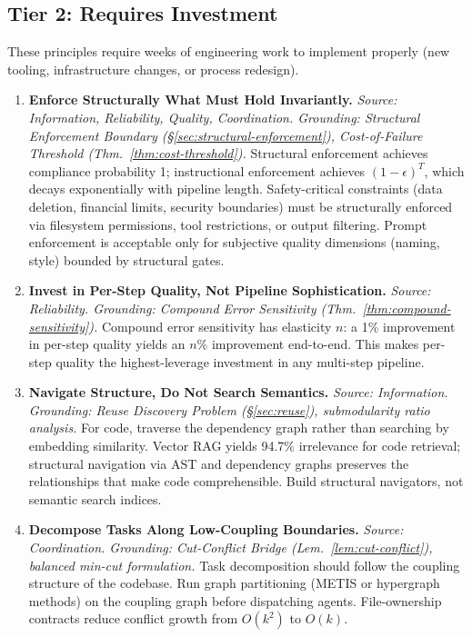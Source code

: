 \subsection{Tier 2: Requires Investment}
\label{sec:tier2}

These principles require weeks of engineering work to implement properly (new tooling, infrastructure changes, or process redesign).

\begin{enumerate}[label=\textbf{P\arabic*.}, leftmargin=3em, resume]

\item \textbf{Enforce Structurally What Must Hold Invariantly.}
\emph{Source: Information, Reliability, Quality, Coordination. Grounding: Structural Enforcement Boundary (\S\ref{sec:structural-enforcement}), Cost-of-Failure Threshold (Thm.~\ref{thm:cost-threshold}).}
Structural enforcement achieves compliance probability 1; instructional enforcement achieves $(1-\epsilon)^T$, which decays exponentially with pipeline length. Safety-critical constraints (data deletion, financial limits, security boundaries) must be structurally enforced via filesystem permissions, tool restrictions, or output filtering. Prompt enforcement is acceptable only for subjective quality dimensions (naming, style) bounded by structural gates.

\item \textbf{Invest in Per-Step Quality, Not Pipeline Sophistication.}
\emph{Source: Reliability. Grounding: Compound Error Sensitivity (Thm.~\ref{thm:compound-sensitivity}).}
Compound error sensitivity has elasticity $n$: a 1\% improvement in per-step quality yields an $n$\% improvement end-to-end. This makes per-step quality the highest-leverage investment in any multi-step pipeline.

\item \textbf{Navigate Structure, Do Not Search Semantics.}
\emph{Source: Information. Grounding: Reuse Discovery Problem (\S\ref{sec:reuse}), submodularity ratio analysis.}
For code, traverse the dependency graph rather than searching by embedding similarity. Vector RAG yields 94.7\% irrelevance for code retrieval; structural navigation via AST and dependency graphs preserves the relationships that make code comprehensible. Build structural navigators, not semantic search indices.

\item \textbf{Decompose Tasks Along Low-Coupling Boundaries.}
\emph{Source: Coordination. Grounding: Cut-Conflict Bridge (Lem.~\ref{lem:cut-conflict}), balanced min-cut formulation.}
Task decomposition should follow the coupling structure of the codebase. Run graph partitioning (METIS or hypergraph methods) on the coupling graph before dispatching agents. File-ownership contracts reduce conflict growth from $O(k^2)$ to $O(k)$.


\end{enumerate}
